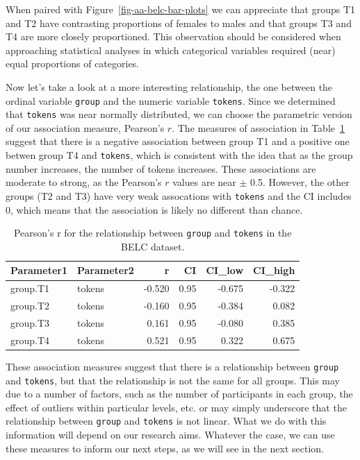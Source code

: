 \documentclass[
  letterpaper,
  DIV=11,
  numbers=noendperiod]{scrreport}
\theoremstyle{definition}
\theoremstyle{remark}
\begin{document}
When paired with Figure~\ref{fig-aa-belc-bar-plots} we can appreciate
that groups T1 and T2 have contrasting proportions of females to males
and that groups T3 and T4 are more closely proportioned. This
observation should be considered when approaching statistical analyses
in which categorical variables required (near) equal proportions of
categories.

Now let's take a look at a more interesting relationship, the one
between the ordinal variable \texttt{group} and the numeric variable
\texttt{tokens}. Since we determined that \texttt{tokens} was near
normally distributed, we can choose the parametric version of our
association measure, Pearson's \(r\). The measures of association in
Table~\ref{tbl-aa-pearson} suggest that there is a negative association
between group T1 and a positive one betwen group T4 and \texttt{tokens},
which is consistent with the idea that as the group number increases,
the number of tokens increases. These associations are moderate to
strong, as the Pearson's \(r\) values are near \(\pm\) 0.5. However, the
other groups (T2 and T3) have very weak assocations with \texttt{tokens}
and the CI includes 0, which means that the association is likely no
different than chance.

\hypertarget{tbl-aa-pearson}{}
\begin{table}
\caption{\label{tbl-aa-pearson}Pearson's r for the relationship between \texttt{group} and
\texttt{tokens} in the BELC dataset. }\tabularnewline

\centering
\begin{tabular}{l|l|r|r|r|r}
\hline
Parameter1 & Parameter2 & r & CI & CI\_low & CI\_high\\
\hline
group.T1 & tokens & -0.520 & 0.95 & -0.675 & -0.322\\
\hline
group.T2 & tokens & -0.160 & 0.95 & -0.384 & 0.082\\
\hline
group.T3 & tokens & 0.161 & 0.95 & -0.080 & 0.385\\
\hline
group.T4 & tokens & 0.521 & 0.95 & 0.322 & 0.675\\
\hline
\end{tabular}
\end{table}

These association measures suggest that there is a relationship between
\texttt{group} and \texttt{tokens}, but that the relationship is not the
same for all groups. This may due to a number of factors, such as the
number of participants in each group, the effect of outliers within
particular levels, etc. or may simply underscore that the relationship
between \texttt{group} and \texttt{tokens} is not linear. What we do
with this information will depend on our research aims. Whatever the
case, we can use these measures to inform our next steps, as we will see
in the next section.
\end{document}
